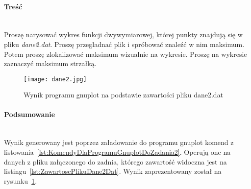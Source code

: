 \paragraph{Treść}~\\
Proszę narysować wykres funkcji dwywymiarowej, której punkty znajdują się w pliku \textit{dane2.dat}.
Proszę przegladnać plik i spróbować znaleźć w nim maksimum.
Potem proszę zlokalizować maksimum wizualnie na wykresie.
Proszę na wykresie zaznaczyć maksimum strzałką.





\begin{figure}[h]
  \caption{Wynik programu gnuplot na podstawie zawartości pliku dane2.dat}
  \label{fig:WynikProgramuGnuplotNaPodstawieZawartosciPlikuDane2Dat}
  \centering
  \texttt{[image: dane2.jpg]}
\end{figure}

\paragraph{Podsumowanie}~\\
Wynik generowany jest poprzez załadowanie do programu gnuplot komend z listowania~\ref{lst:KomendyDlaProgramuGnuplotDoZadania2}.
Operują one na danych z pliku załączonego do zadnia, którego zawartość widoczna jest na listingu~\ref{lst:ZawartoscPlikuDane2Dat}.
Wynik zaprezentowany został na rysunku~\ref{fig:WynikProgramuGnuplotNaPodstawieZawartosciPlikuDane2Dat}.
